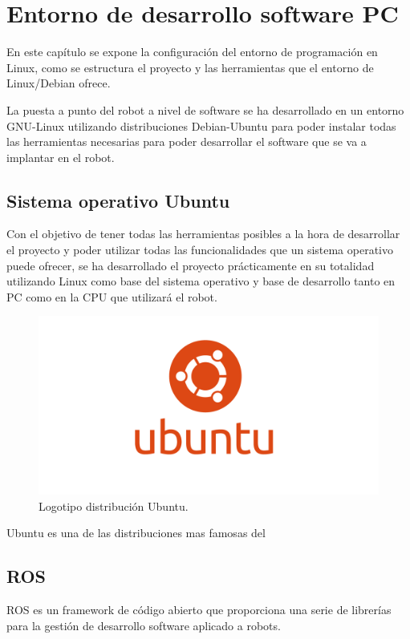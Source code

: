 \section{Entorno de desarrollo software PC}\label{cap:analisis}

En este capítulo se expone la configuración del entorno de programación en Linux, como se estructura el proyecto y las herramientas que el entorno de Linux/Debian ofrece.

La puesta a punto del robot a nivel de software se ha desarrollado en un entorno GNU-Linux utilizando distribuciones Debian-Ubuntu para poder instalar todas las herramientas necesarias para poder desarrollar el software que se va a implantar en el robot. 

\subsection{Sistema operativo Ubuntu}
Con el objetivo de tener todas las herramientas posibles a la hora de desarrollar el proyecto y poder utilizar todas las funcionalidades que un sistema operativo puede ofrecer, se ha desarrollado el proyecto prácticamente en su totalidad utilizando Linux como base del sistema operativo y base de desarrollo tanto en PC como en la CPU que utilizará el robot.

\begin{figure}[h]
    \centering
    \includegraphics[scale=0.15]{fig/ubuntu.png}
    \caption{Logotipo distribución Ubuntu.}
    \label{fig:mesh1}
\end{figure}

Ubuntu es una de las distribuciones mas famosas del 
\subsection{ROS}
ROS es un framework de código abierto que proporciona una serie de librerías para la gestión de desarrollo software aplicado a robots.

